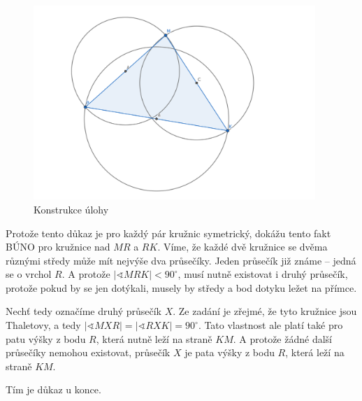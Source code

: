 \documentclass{fkssolpub}
\author{Ondřej Sedláček}
\renewcommand{\angle}{\sphericalangle}
\begin{document}
\begin{figure}[h!]
  \begin{center}
    \includegraphics[width=0.95\textwidth]{A-fig.png}
  \end{center}
  \caption{Konstrukce úlohy}\label{fig:}
\end{figure}


Protože tento důkaz je pro každý pár kružnic symetrický, dokážu tento fakt BÚNO pro kružnice nad $MR$ a $RK$. Víme, že každé dvě kružnice se dvěma různými středy může mít nejvýše dva průsečíky. Jeden průsečík již známe -- jedná se o vrchol $R$. A protože $|\angle MRK| < 90^{\circ}$, musí nutně existovat i druhý průsečík, protože pokud by se jen dotýkali, musely by středy a bod dotyku ležet na přímce. 

Nechť tedy označíme druhý průsečík $X$. Ze zadání je zřejmé, že tyto kružnice jsou Thaletovy, a tedy $|\angle MXR| = |\angle RXK| = 90^{\circ}$. Tato vlastnost ale platí také pro patu výšky z bodu $R$, která nutně leží na straně $KM$. A protože žádné další průsečíky nemohou existovat, průsečík $X$ je pata výšky z bodu $R$, která leží na straně $KM$.

Tím je důkaz u konce.
\end{document}
